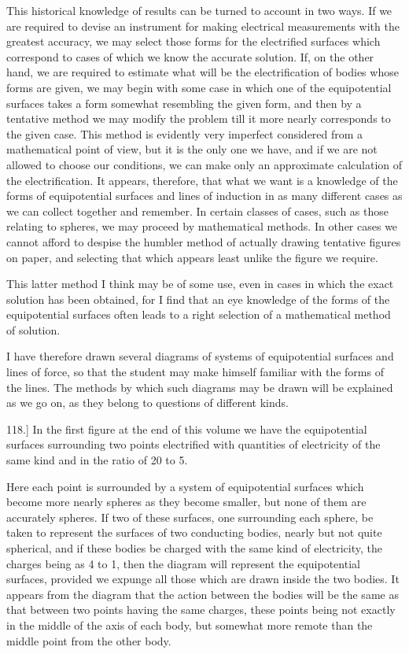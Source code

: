 \documentclass[11pt,a4paper]{article}
\begin{document}
This historical knowledge of results can be turned to account in two ways. If we are required to devise an instrument for making electrical measurements with the greatest accuracy, we may select those forms for the electrified surfaces which correspond to cases of which we know the accurate solution. If, on the other hand, we are required to estimate what will be the electrification of bodies whose forms are given, we may begin with some case in which one of the equipotential surfaces takes a form somewhat resembling the given form, and then by a tentative method we may modify the problem till it more nearly corresponds to the given case. This method is evidently very imperfect considered from a mathematical point of view, but it is the only one we have, and if we are not allowed to choose our conditions, we can make only an approximate calculation of the electrification. It appears, therefore, that what we want is a knowledge of the forms of equipotential surfaces and lines of induction in as many different cases as we can collect together and remember. In certain classes of cases, such as those relating to spheres, we may proceed by mathematical methods. In other cases we cannot afford to despise the humbler method of actually drawing tentative figures on paper, and selecting that which appears least unlike the figure we require.

This latter method I think may be of some use, even in cases in which the exact solution has been obtained, for I find that an eye knowledge of the forms of the equipotential surfaces often leads to a right selection of a mathematical method of solution.

I have therefore drawn several diagrams of systems of equipotential surfaces and lines of force, so that the student may make himself familiar with the forms of the lines. The methods by which such diagrams may be drawn will be explained as we go on, as they belong to questions of different kinds.

118.] In the first figure at the end of this volume we have the equipotential surfaces surrounding two points electrified with quantities of electricity of the same kind and in the ratio of 20 to 5.

Here each point is surrounded by a system of equipotential surfaces which become more nearly spheres as they become smaller, but none of them are accurately spheres. If two of these surfaces, one surrounding each sphere, be taken to represent the surfaces of two conducting bodies, nearly but not quite spherical, and if these bodies be charged with the same kind of electricity, the charges being as 4 to 1, then the diagram will represent the equipotential surfaces, provided we expunge all those which are drawn inside the two bodies. It appears from the diagram that the action between the bodies will be the same as that between two points having the same charges, these points being not exactly in the middle of the axis of each body, but somewhat more remote than the middle point from the other body.
\end{document}
